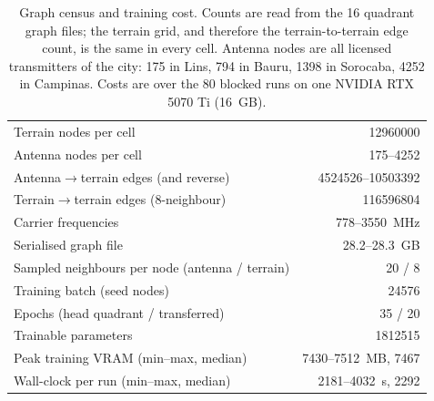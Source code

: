 \begin{table}[t]
\caption{Graph census and training cost. Counts are read from the 16 quadrant graph files; the terrain grid, and therefore the terrain-to-terrain edge count, is the same in every cell. Antenna nodes are all licensed transmitters of the city: \num{175} in Lins, \num{794} in Bauru, \num{1398} in Sorocaba, \num{4252} in Campinas. Costs are over the 80 blocked runs on one NVIDIA RTX 5070 Ti (16~GB).}
\label{tab:graph_census}
\centering
\footnotesize
\begin{tabular}{@{}p{}@{\hspace{4pt}}r@{}}
\toprule
Terrain nodes per cell & \num{12960000} \\
Antenna nodes per cell & \num{175}--\num{4252} \\
Antenna$\to$terrain edges (and reverse) & \num{4524526}--\num{10503392} \\
Terrain$\to$terrain edges (8-neighbour) & \num{116596804} \\
Carrier frequencies & 778--3550~MHz \\
Serialised graph file & 28.2--28.3~GB \\
Sampled neighbours per node (antenna / terrain) & 20 / 8 \\
Training batch (seed nodes) & \num{24576} \\
Epochs (head quadrant / transferred) & 35 / 20 \\
Trainable parameters & \num{1812515} \\
Peak training VRAM (min--max, median) & 7430--7512~MB, 7467 \\
Wall-clock per run (min--max, median) & 2181--4032~s, 2292 \\
\bottomrule
\end{tabular}
\end{table}

